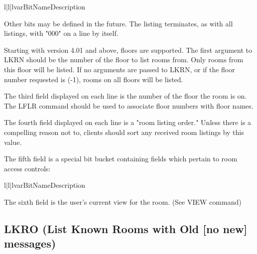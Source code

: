 \begin{tableiii}{l|l|l}{var}{Bit}{Name}{Description}



\end{tableiii}



 Other bits may be defined in the future.  The listing terminates, as with
all listings, with "000" on a line by itself.

 Starting with version 4.01 and above, floors are supported.  The first
argument to LKRN should be the number of the floor to list rooms from.  Only
rooms from this floor will be listed.  If no arguments are passed to LKRN, or
if the floor number requested is (-1), rooms on all floors will be listed.

 The third field displayed on each line is the number of the floor the room
is on.  The LFLR command should be used to associate floor numbers with
floor names.

 The fourth field displayed on each line is a "room listing order."  Unless
there is a compelling reason not to, clients should sort any received room
listings by this value.

 The fifth field is a special bit bucket containing fields which pertain to
room access controls:

\begin{tableiii}{l|l|l}{var}{Bit}{Name}{Description}





\end{tableiii}


 The sixth field is the user's current view for the room. (See VIEW command)



\subsection{LKRO (List Known Rooms with Old [no new] messages)}

